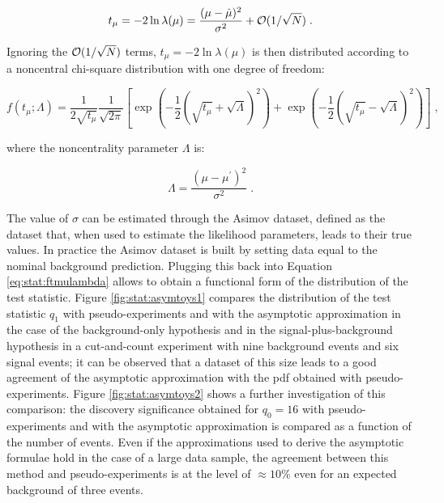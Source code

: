 \begin{equation}
\label{eq:wald}
t_{\mu} = -2 \ln \lambda(\mu)
= \frac{(\mu - \hat{\mu})^2}{\sigma^2} + {\cal  O}(1/\sqrt{N}) \;.
\end{equation}

\noindent Ignoring the ${\cal  O}(1/\sqrt{N})$ terms, $t_{\mu} = -2 \ln \lambda(\mu)$ is then distributed according to a noncentral chi-square distribution with one degree of freedom:

\begin{equation}
\label{eq:stat:ftmulambda}
f(t_{\mu};\Lambda) = \frac{1}{2 \sqrt{t_{\mu}}} \frac{1}{\sqrt{2 \pi}}
\left[ \exp \left( - \frac{1}{2}
\left( \sqrt{t_{\mu}} + \sqrt{\Lambda} \right)^2 \right) +
\exp \left( - \frac{1}{2} \left( \sqrt{t_{\mu}} - \sqrt{\Lambda} \right)^2
\right) \right] \;,
\end{equation}

\noindent where the noncentrality parameter $\Lambda$ is:

\begin{equation}
\label{eq:stat:noncentrality}
\Lambda = \frac{(\mu - \mu^{\prime})^2}{\sigma^2} \; .
\end{equation}

\noindent The value of $\sigma$ can be estimated through the Asimov dataset, defined as the dataset that, when used to estimate the likelihood parameters, leads to their true values. 
In practice the Asimov dataset is built by setting data equal to the nominal background prediction. 
Plugging this back into Equation \ref{eq:stat:ftmulambda} allows to obtain a functional form of the distribution of the test statistic. Figure \ref{fig:stat:asymtoys1} compares the distribution of the test statistic $q_1$ with pseudo-experiments and with the asymptotic approximation in the case of the background-only hypothesis and in the signal-plus-background hypothesis
in a cut-and-count experiment with nine background events and six signal events; 
it can be observed that a dataset of this size leads to a good agreement of the asymptotic approximation with the \gls{pdf} obtained with pseudo-experiments.
Figure \ref{fig:stat:asymtoys2} shows a further investigation of this comparison: the discovery significance obtained for $q_0=16$ with pseudo-experiments and with the asymptotic approximation is compared as a function of the number of events. 
Even if the approximations used to derive the asymptotic formulae hold in the case of a large data sample, 
the agreement between this method and pseudo-experiments is at the level of $\approx 10\%$ even for an expected background of three events. 


